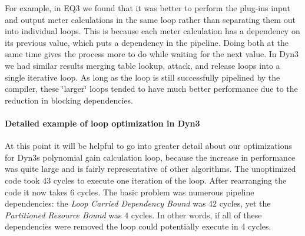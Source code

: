 For example, in E\+Q3 we found that it was better to perform the plug-\/in\textquotesingle{}s input and output meter calculations in the same loop rather than separating them out into individual loops. This is because each meter calculation has a dependency on its previous value, which puts a dependency in the pipeline. Doing both at the same time gives the process more to do while waiting for the next value. In Dyn3 we had similar results merging table lookup, attack, and release loops into a single iterative loop. As long as the loop is still successfully pipelined by the compiler, these \char`\"{}larger\char`\"{} loops tended to have much better performance due to the reduction in blocking dependencies.

\hypertarget{a00362_subsubsection__detailed_example_of_loop_optimization_in_dyn3_}{}\paragraph{Detailed example of loop optimization in Dyn3}\label{a00362_subsubsection__detailed_example_of_loop_optimization_in_dyn3_}
 At this point it will be helpful to go into greater detail about our optimizations for Dyn3\textquotesingle{}s polynomial gain calculation loop, because the increase in performance was quite large and is fairly representative of other algorithms. The unoptimized code took 43 cycles to execute one iteration of the loop. After rearranging the code it now takes 6 cycles. The basic problem was numerous pipeline dependencies\+: the {\itshape  Loop Carried Dependency Bound} was 42 cycles, yet the {\itshape  Partitioned Resource Bound} was 4 cycles. In other words, if all of these dependencies were removed the loop could potentially execute in 4 cycles.


